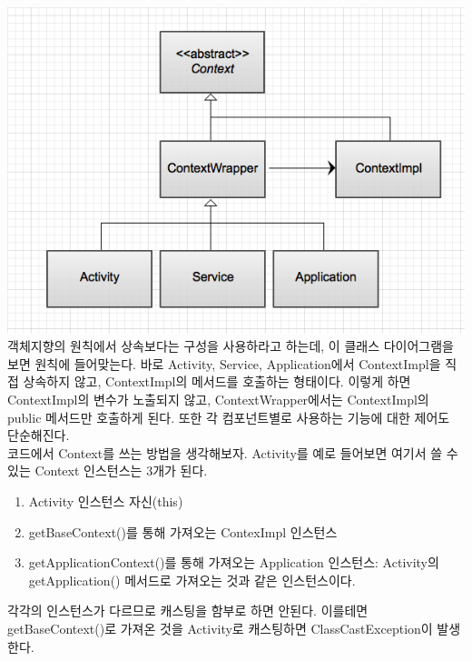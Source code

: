 \includegraphics[scale=0.5]{context}\\
객체지향의 원칙에서 상속보다는 구성을 사용하라고 하는데, 이 클래스 다이어그램을 보면 원칙에 들어맞는다.
바로 Activity, Service, Application에서 ContextImpl을 직접 상속하지 않고, ContextImpl의 메서드를 호출하는 형태이다. 이렇게 하면 ContextImpl의 변수가 노출되지 않고, ContextWrapper에서는 ContextImpl의 public 메서드만 호출하게 된다. 또한 각 컴포넌트별로 사용하는 기능에 대한 제어도 단순해진다.\\

코드에서 Context를 쓰는 방법을 생각해보자.
Activity를 예로 들어보면 여기서 쓸 수 있는 Context 인스턴스는 3개가 된다. 
\begin{enumerate}
\item Activity 인스턴스 자신(this)
\item getBaseContext()를 통해 가져오는 ContexImpl 인스턴스
\item getApplicationContext()를 통해 가져오는 Application 인스턴스: Activity의 getApplication() 메서드로 가져오는 것과 같은 인스턴스이다.
\end{enumerate}

각각의 인스턴스가 다르므로 캐스팅을 함부로 하면 안된다. 이를테면 getBaseContext()로 가져온 것을 Activity로 캐스팅하면 ClassCastException이 발생한다.\\


